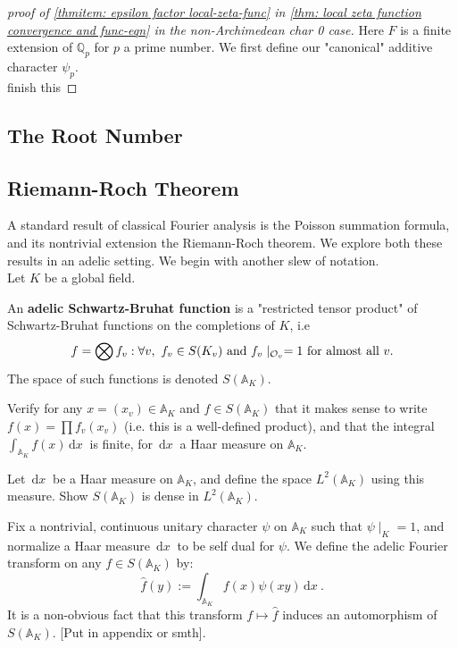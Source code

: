 \documentclass[11pt, x11names]{article}
\newcommand{\qq}{\mathbb{Q}}
\renewcommand{\aa}{\mathbb{A}}
\newcommand{\bigtensor}{\bigotimes}
\renewcommand{\hat}{\widehat}
\newcommand{\dx}{\, \mathrm{d}x \ }
\begin{document}
\begin{proof}[proof of \ref{thmitem: epsilon factor local-zeta-func} in \ref{thm: local zeta function convergence and func-eqn} in the non-Archimedean char 0 case]
Here $F$ is a finite extension of $\qq_p$ for $p$ a prime number. We first define our "canonical" additive character $\psi_p$.\\
 finish this

\end{proof}




\subsection{The Root Number}
\label{subsection: The Root Number}


\subsection{Riemann-Roch Theorem}
\label{subsection: Riemann-Roch}

A standard result of classical Fourier analysis is the Poisson summation formula, and its nontrivial extension the Riemann-Roch theorem. We explore both these results in an adelic setting. We begin with another slew of notation.\\
Let $K$ be a global field.
\begin{defn}
\label{def: adelic SB-functions}
An \textbf{adelic Schwartz-Bruhat function} is a "restricted tensor product" of Schwartz-Bruhat functions on the completions of $K$, i.e
\begin{equation*}
    f = \bigtensor f_v : \forall v, \ f_v \in S(K_v) \text{ and } f_v\mid_{\calo_v} = 1 \text{ for almost all } v.
\end{equation*}
The space of such functions is denoted $S(\aa_K)$.
\end{defn}
\begin{sanitycheck}
    Verify for any $x = (x_v) \in \aa_K$ and $f \in S(\aa_K)$ that it makes sense to write $f(x) = \prod f_v(x_v)$ (i.e. this is a well-defined product), and that the integral $\int_{\aa_K} f(x) \dx$ is finite, for $\dx$ a Haar measure on $\aa_K$.
\end{sanitycheck}
\begin{exercise}
\label{exercise: S(A_K) dense in L^2(A_K)}
    Let $\dx$ be a Haar measure on $\aa_K$, and define the space $L^2(\aa_K)$ using this measure. Show $S(\aa_K)$ is dense in $L^2(\aa_K)$.
\end{exercise}
Fix a nontrivial, continuous unitary character $\psi$ on $\aa_K$ such that $\psi \mid_K = 1$, and normalize a Haar measure $\dx$ to be self dual for $\psi$. We define the adelic Fourier transform on any $f \in S(\aa_K)$ by:
\begin{equation*}
    \hat{f}(y) := \int_{\aa_K} f(x) \psi(xy) \dx.
\end{equation*}
It is a non-obvious fact that this transform $f \mapsto \hat{f}$ induces an automorphism of $S(\aa_K)$. [Put in appendix or smth].\\
\end{document}
